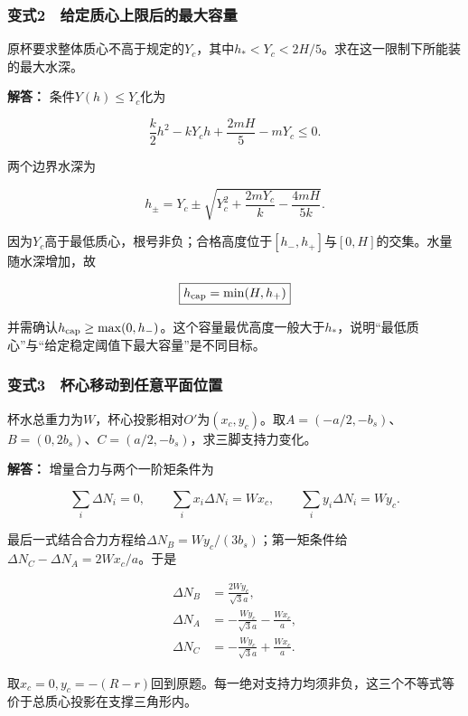 \documentclass[12pt,a4paper,fontset=fandol]{ctexart}
\begin{document}
\subsubsection{变式2　给定质心上限后的最大容量}\label{ux53d8ux5f0f2-ux7ed9ux5b9aux8d28ux5fc3ux4e0aux9650ux540eux7684ux6700ux5927ux5bb9ux91cf}

原杯要求整体质心不高于规定的\(Y_c\)，其中\(h_*<Y_c<2H/5\)。求在这一限制下所能装的最大水深。

\textbf{解答：} 条件\(Y(h)\le Y_c\)化为

\[
\frac k2h^2-kY_ch+\frac{2mH}{5}-mY_c\le0.
\]

两个边界水深为

\[
h_\pm=Y_c\pm
\sqrt{Y_c^2+\frac{2mY_c}{k}-\frac{4mH}{5k}}.
\]

因为\(Y_c\)高于最低质心，根号非负；合格高度位于\([h_-,h_+]\)与\([0,H]\)的交集。水量随水深增加，故

\[
\boxed{h_{\rm cap}=\min(H,h_+)}
\]

并需确认\(h_{\rm cap}\ge\max(0,h_-)\)。这个容量最优高度一般大于\(h_*\)，说明``最低质心''与``给定稳定阈值下最大容量''是不同目标。

\subsubsection{变式3　杯心移动到任意平面位置}\label{ux53d8ux5f0f3-ux676fux5fc3ux79fbux52a8ux5230ux4efbux610fux5e73ux9762ux4f4dux7f6e}

杯水总重力为\(W\)，杯心投影相对\(O'\)为\((x_c,y_c)\)。取\(A=(-a/2,-b_s)\)、\(B=(0,2b_s)\)、\(C=(a/2,-b_s)\)，求三脚支持力变化。

\textbf{解答：} 增量合力与两个一阶矩条件为

\[
\sum_i\Delta N_i=0,\qquad
\sum_i x_i\Delta N_i=Wx_c,\qquad
\sum_i y_i\Delta N_i=Wy_c.
\]

最后一式结合合力方程给\(\Delta N_B=Wy_c/(3b_s)\)；第一矩条件给\(\Delta N_C-\Delta N_A=2Wx_c/a\)。于是

\[
\boxed{
\begin{aligned}
\Delta N_B&=\frac{2Wy_c}{\sqrt3a},\\
\Delta N_A&=-\frac{Wy_c}{\sqrt3a}-\frac{Wx_c}{a},\\
\Delta N_C&=-\frac{Wy_c}{\sqrt3a}+\frac{Wx_c}{a}.
\end{aligned}}
\]

取\(x_c=0,y_c=-(R-r)\)回到原题。每一绝对支持力均须非负，这三个不等式等价于总质心投影在支撑三角形内。
\end{document}
